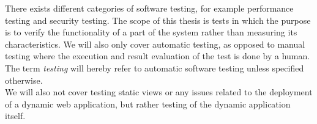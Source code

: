 There exists different categories of software testing, for example
performance testing and security testing. The scope of this thesis is
tests in which the purpose is to verify the functionality of a part of
the system rather than measuring its characteristics. We will also only
cover automatic testing, as opposed to manual testing where the
execution and result evaluation of the test is done by a human. The term
\emph{testing} will hereby refer to automatic software testing unless
specified otherwise.\\

We will also not cover testing static views or any issues related to the
deployment of a dynamic web application, but rather testing of the
dynamic application itself.
